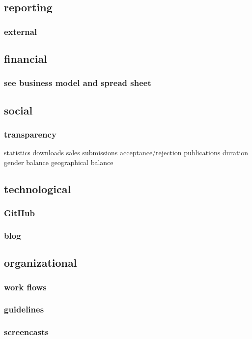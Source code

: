 \documentclass[output=guidelines,guidelines] {langscibook}
\begin{document}
\subsection{reporting}
\subsubsection{external}
\subsection{financial}
\subsubsection{see business model and spread sheet}
\subsection{social}
\subsubsection{transparency}
                    statistics
                        downloads
                        sales
                        submissions
                        acceptance/rejection
                        publications
                        duration
                        gender balance
                        geographical balance
\subsection{technological}
\subsubsection{GitHub}
\subsubsection{blog}
\subsection{organizational}
\subsubsection{work flows}
\subsubsection{guidelines}
\subsubsection{screencasts}
\end{document}
